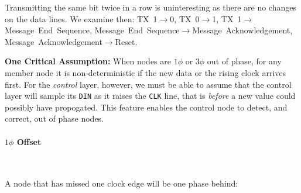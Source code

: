 Transmitting the same bit twice in a row is uninteresting as there are no
changes on the data lines. We examine then: TX~1$\rightarrow$0,
TX~0$\rightarrow$1, TX~1$\rightarrow$Message~End~Sequence,
Message~End~Sequence$\rightarrow$Message~Acknowledgement,
Message~Acknowledgement$\rightarrow$Reset.

\medskip
\noindent
\begin{framed}
  \label{reset-assumption}
  \textbf{One Critical Assumption:} When nodes are $1\phi$ or $3\phi$ out of
  phase, for any member node it is non-deterministic if the new data or the
  rising clock arrives first. For the {\em control} layer, however, we must
  be able to assume that the control layer will sample its {\tt DIN} as it
  raises the {\tt CLK} line, that is {\em before} a new value could possibly
  have propogated. This feature enables the control node to detect, and
  correct, out of phase nodes.
\end{framed}

\paragraph{$1\phi$ Offset}
~

A node that has missed one clock edge will be one phase behind:

